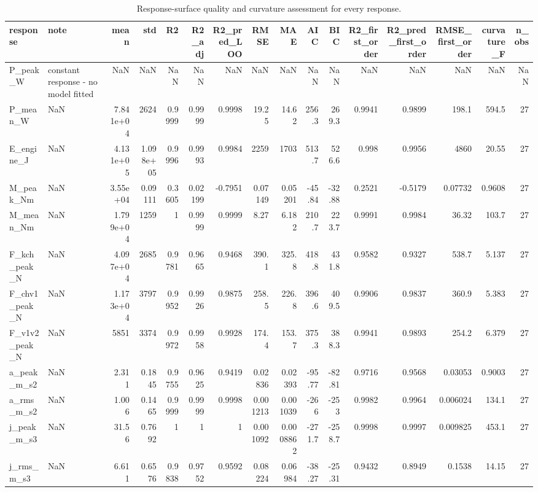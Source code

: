 \begin{table}
\caption{Response-surface quality and curvature assessment for every response.}
\label{tab:table09_model_quality}
\begin{tabular}{llrrrrrrrrrrrrrr}
\toprule
response & note & mean & std & R2 & R2\_adj & R2\_pred\_LOO & RMSE & MAE & AIC & BIC & R2\_first\_order & R2\_pred\_first\_order & RMSE\_first\_order & curvature\_F & n\_obs \\
\midrule
P\_peak\_W & constant response - no model fitted & NaN & NaN & NaN & NaN & NaN & NaN & NaN & NaN & NaN & NaN & NaN & NaN & NaN & NaN \\
P\_mean\_W & NaN & 7.841e+04 & 2624 & 0.9999 & 0.9999 & 0.9998 & 19.25 & 14.62 & 256.3 & 269.3 & 0.9941 & 0.9899 & 198.1 & 594.5 & 27 \\
E\_engine\_J & NaN & 4.131e+05 & 1.098e+05 & 0.9996 & 0.9993 & 0.9984 & 2259 & 1703 & 513.7 & 526.6 & 0.998 & 0.9956 & 4860 & 20.55 & 27 \\
M\_peak\_Nm & NaN & 3.55e+04 & 0.09111 & 0.3605 & 0.02199 & -0.7951 & 0.07149 & 0.05201 & -45.84 & -32.88 & 0.2521 & -0.5179 & 0.07732 & 0.9608 & 27 \\
M\_mean\_Nm & NaN & 1.799e+04 & 1259 & 1 & 0.9999 & 0.9999 & 8.27 & 6.182 & 210.7 & 223.7 & 0.9991 & 0.9984 & 36.32 & 103.7 & 27 \\
F\_kch\_peak\_N & NaN & 4.097e+04 & 2685 & 0.9781 & 0.9665 & 0.9468 & 390.1 & 325.8 & 418.8 & 431.8 & 0.9582 & 0.9327 & 538.7 & 5.137 & 27 \\
F\_chv1\_peak\_N & NaN & 1.173e+04 & 3797 & 0.9952 & 0.9926 & 0.9875 & 258.5 & 226.8 & 396.6 & 409.5 & 0.9906 & 0.9837 & 360.9 & 5.383 & 27 \\
F\_v1v2\_peak\_N & NaN & 5851 & 3374 & 0.9972 & 0.9958 & 0.9928 & 174.4 & 153.7 & 375.3 & 388.3 & 0.9941 & 0.9893 & 254.2 & 6.379 & 27 \\
a\_peak\_m\_s2 & NaN & 2.311 & 0.1845 & 0.9755 & 0.9625 & 0.9419 & 0.02836 & 0.02393 & -95.77 & -82.81 & 0.9716 & 0.9568 & 0.03053 & 0.9003 & 27 \\
a\_rms\_m\_s2 & NaN & 1.006 & 0.1465 & 0.9999 & 0.9999 & 0.9998 & 0.001213 & 0.001039 & -266 & -253 & 0.9982 & 0.9964 & 0.006024 & 134.1 & 27 \\
j\_peak\_m\_s3 & NaN & 31.56 & 0.7692 & 1 & 1 & 1 & 0.001092 & 0.0008862 & -271.7 & -258.7 & 0.9998 & 0.9997 & 0.009825 & 453.1 & 27 \\
j\_rms\_m\_s3 & NaN & 6.611 & 0.6576 & 0.9838 & 0.9752 & 0.9592 & 0.08224 & 0.06984 & -38.27 & -25.31 & 0.9432 & 0.8949 & 0.1538 & 14.15 & 27 \\

\end{tabular}
\end{table}

